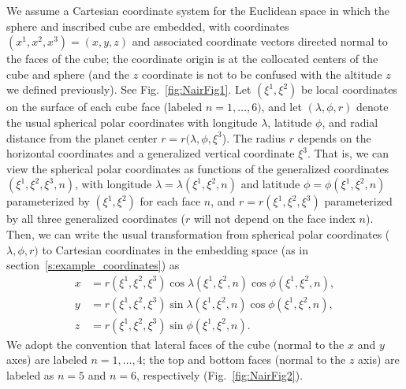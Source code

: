 \documentclass{report}
\begin{document}
We assume a Cartesian coordinate system for the Euclidean space in which the sphere and inscribed cube are embedded, with coordinates $(x^1, x^2, x^3) = (x, y, z)$ and associated coordinate vectors directed normal to the faces of the cube; the coordinate origin is at the collocated centers of the cube and sphere (and the $z$ coordinate is not to be confused with the altitude $z$ we defined previously). See Fig.~\ref{fig:NairFig1}. Let $(\xi^1, \xi^2)$ be local coordinates on the surface of each cube face (labeled $n=1,\dots, 6)$,  and let $(\lambda, \phi, r)$ denote the usual spherical polar coordinates with longitude  $\lambda$, latitude $\phi$, and radial distance from the planet center $r=r(\lambda, \phi, \xi^3$). The radius $r$ depends on the horizontal coordinates and a generalized vertical coordinate $\xi^3$. That is, we can view the spherical polar coordinates as functions of the generalized coordinates $(\xi^1, \xi^2, \xi^3, n)$, with longitude $\lambda = \lambda(\xi^1, \xi^2, n)$ and latitude $\phi = \phi(\xi^1, \xi^2, n)$ parameterized by $(\xi^1, \xi^2)$ for each face $n$, and $r = r(\xi^1, \xi^2, \xi^3)$ parameterized by all three generalized coordinates ($r$ will not depend on the face index $n$). Then, we can write the usual transformation from spherical polar coordinates ($\lambda, \phi, r)$ to Cartesian coordinates in the embedding space (as in section~\ref{s:example_coordinates}) as
\begin{subequations} \label{e:spherical-coords-terrain-follow}
    \begin{align}
    x &= r(\xi^1, \xi^2, \xi^3) \cos \lambda(\xi^1, \xi^2, n) \cos \phi(\xi^1, \xi^2, n) , \\
    y &= r(\xi^1, \xi^2, \xi^3) \sin \lambda(\xi^1, \xi^2, n) \cos \phi(\xi^1, \xi^2, n) , \\
    z &= r(\xi^1, \xi^2, \xi^3) \sin \phi(\xi^1, \xi^2, n).
    \end{align}
\end{subequations}
We adopt the convention that lateral faces of the cube (normal to the $x$ and $y$ axes) are labeled $n=1, \dots, 4$; the top and bottom faces (normal to the $z$ axis) are labeled as $n=5$ and $n=6$, respectively (Fig.~\ref{fig:NairFig2}).


\end{document}
